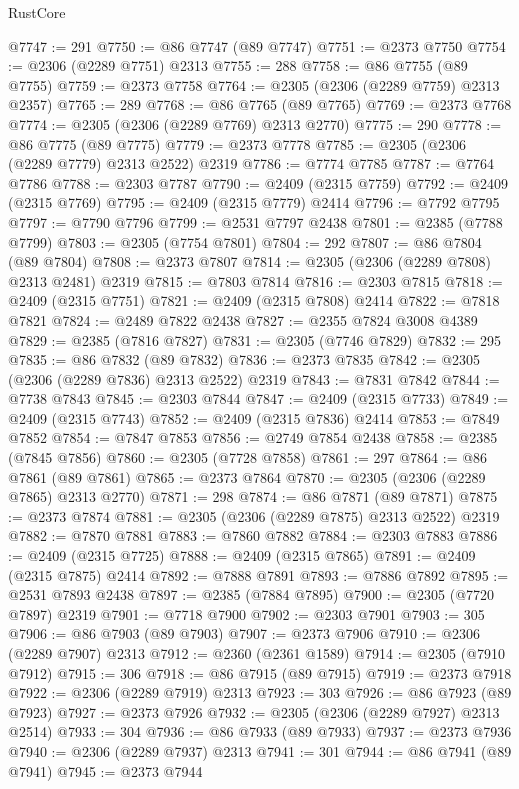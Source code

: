 \begin{lexlean}{RustCore}
\begin{coremodule}
@7747 := 291
@7750 := @86 @7747 (@89 @7747)
@7751 := @2373 @7750
@7754 := @2306 (@2289 @7751) @2313
@7755 := 288
@7758 := @86 @7755 (@89 @7755)
@7759 := @2373 @7758
@7764 := @2305 (@2306 (@2289 @7759) @2313 @2357)
@7765 := 289
@7768 := @86 @7765 (@89 @7765)
@7769 := @2373 @7768
@7774 := @2305 (@2306 (@2289 @7769) @2313 @2770)
@7775 := 290
@7778 := @86 @7775 (@89 @7775)
@7779 := @2373 @7778
@7785 := @2305 (@2306 (@2289 @7779) @2313 @2522) @2319
@7786 := @7774 @7785
@7787 := @7764 @7786
@7788 := @2303 @7787
@7790 := @2409 (@2315 @7759)
@7792 := @2409 (@2315 @7769)
@7795 := @2409 (@2315 @7779) @2414
@7796 := @7792 @7795
@7797 := @7790 @7796
@7799 := @2531 @7797 @2438
@7801 := @2385 (@7788 @7799)
@7803 := @2305 (@7754 @7801)
@7804 := 292
@7807 := @86 @7804 (@89 @7804)
@7808 := @2373 @7807
@7814 := @2305 (@2306 (@2289 @7808) @2313 @2481) @2319
@7815 := @7803 @7814
@7816 := @2303 @7815
@7818 := @2409 (@2315 @7751)
@7821 := @2409 (@2315 @7808) @2414
@7822 := @7818 @7821
@7824 := @2489 @7822 @2438
@7827 := @2355 @7824 @3008 @4389
@7829 := @2385 (@7816 @7827)
@7831 := @2305 (@7746 @7829)
@7832 := 295
@7835 := @86 @7832 (@89 @7832)
@7836 := @2373 @7835
@7842 := @2305 (@2306 (@2289 @7836) @2313 @2522) @2319
@7843 := @7831 @7842
@7844 := @7738 @7843
@7845 := @2303 @7844
@7847 := @2409 (@2315 @7733)
@7849 := @2409 (@2315 @7743)
@7852 := @2409 (@2315 @7836) @2414
@7853 := @7849 @7852
@7854 := @7847 @7853
@7856 := @2749 @7854 @2438
@7858 := @2385 (@7845 @7856)
@7860 := @2305 (@7728 @7858)
@7861 := 297
@7864 := @86 @7861 (@89 @7861)
@7865 := @2373 @7864
@7870 := @2305 (@2306 (@2289 @7865) @2313 @2770)
@7871 := 298
@7874 := @86 @7871 (@89 @7871)
@7875 := @2373 @7874
@7881 := @2305 (@2306 (@2289 @7875) @2313 @2522) @2319
@7882 := @7870 @7881
@7883 := @7860 @7882
@7884 := @2303 @7883
@7886 := @2409 (@2315 @7725)
@7888 := @2409 (@2315 @7865)
@7891 := @2409 (@2315 @7875) @2414
@7892 := @7888 @7891
@7893 := @7886 @7892
@7895 := @2531 @7893 @2438
@7897 := @2385 (@7884 @7895)
@7900 := @2305 (@7720 @7897) @2319
@7901 := @7718 @7900
@7902 := @2303 @7901
@7903 := 305
@7906 := @86 @7903 (@89 @7903)
@7907 := @2373 @7906
@7910 := @2306 (@2289 @7907) @2313
@7912 := @2360 (@2361 @1589)
@7914 := @2305 (@7910 @7912)
@7915 := 306
@7918 := @86 @7915 (@89 @7915)
@7919 := @2373 @7918
@7922 := @2306 (@2289 @7919) @2313
@7923 := 303
@7926 := @86 @7923 (@89 @7923)
@7927 := @2373 @7926
@7932 := @2305 (@2306 (@2289 @7927) @2313 @2514)
@7933 := 304
@7936 := @86 @7933 (@89 @7933)
@7937 := @2373 @7936
@7940 := @2306 (@2289 @7937) @2313
@7941 := 301
@7944 := @86 @7941 (@89 @7941)
@7945 := @2373 @7944

\end{coremodule}
\end{lexlean}
